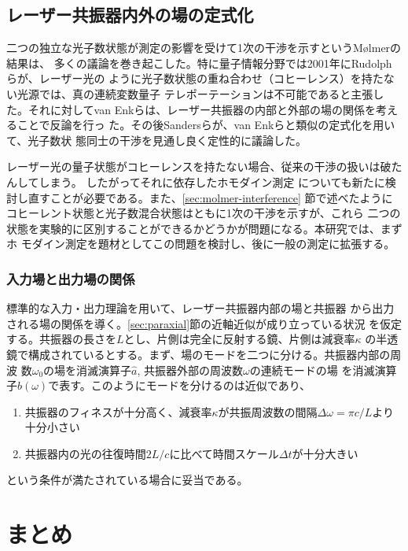 \documentclass[10pt]{jsarticle}
\newcommand{\ope}[1]{\hat{#1}}
\begin{document}
\subsection{レーザー共振器内外の場の定式化}
\label{sec:laser-state}

二つの独立な光子数状態が測定の影響を受けて1次の干渉を示すというM{\o}lmerの結果は、
多くの議論を巻き起こした。特に量子情報分野では2001年にRudolphらが、レーザー光の
ように光子数状態の重ね合わせ（コヒーレンス）を持たない光源では、真の連続変数量子
テレポーテーションは不可能であると主張した\cite{Rudolph2001}。それに対してvan
Enkらは、レーザー共振器の内部と外部の場の関係を考えることで反論を行っ
た\cite{vanEnk2002}。その後Sandersらが、van Enkらと類似の定式化を用いて、光子数状
態同士の干渉を見通し良く定性的に議論した\cite{Sanders2003}。

レーザー光の量子状態がコヒーレンスを持たない場合、従来の干渉の扱いは破たんしてしまう。
したがってそれに依存したホモダイン測定
についても新たに検討し直すことが必要である。また、\ref{sec:molmer-interference}
節で述べたようにコヒーレント状態と光子数混合状態はともに1次の干渉を示すが、これら
二つの状態を実験的に区別することができるかどうかが問題になる。本研究では、まずホ
モダイン測定を題材としてこの問題を検討し、後に一般の測定に拡張する。

\subsubsection*{入力場と出力場の関係}

標準的な入力・出力理論\cite{input-output}を用いて、レーザー共振器内部の場と共振器
から出力される場の関係を導く。\ref{sec:paraxial}節の近軸近似が成り立っている状況
を仮定する。共振器の長さを$L$とし、片側は完全に反射する鏡、片側は減衰率$\kappa$
の半透鏡で構成されているとする。まず、場のモードを二つに分ける。共振器内部の周波
数$\omega_0$の場を消滅演算子$\ope{a}$, 共振器外部の周波数$\omega$の連続モードの場
を消滅演算子$\ope{b}(\omega)$で表す。このようにモードを分けるのは近似であり、
\begin{enumerate}
\item 共振器のフィネスが十分高く、減衰率$\kappa$が共振周波数の間隔$\Delta\omega
  = \pi c/L$より十分小さい
\item 共振器内の光の往復時間$2L/c$に比べて時間スケール$\Delta t$が十分大きい
\end{enumerate}
という条件が満たされている場合に妥当である\cite{Vogel}。

\section{まとめ}
\end{document}
